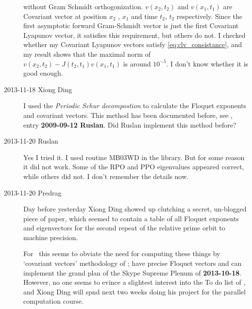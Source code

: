 \begin{description}
without Gram Schmidt orthogonization.  $v(x_2, t_2)$ and  $v(x_1, t_1)$ are Covariant vector
 at position $x_2$ ,  $x_1$ and time $t_2$, $t_2$ respectively. Since the first asymptotic forward Gram-Schmidt vector
is just the first Covariant Lyapunov vector, it satisfies this requirement, but others do not.  I checked whether my Covariant Lyapunov
vectors satisfy  \ref{eq:clv_consistance}, and my result shows that the maximal norm of
$v(x_2, t_2)-J(t_2, t_1)v(x_1, t_1)$ is around $10^{-5}$.
I don't know whether it is good enough.

\item[2013-11-18 Xiong Ding]
I used the \textit{Periodic Schur decompostion}
to calculate the Floquet exponents and covariant vectors. This method has been
documented before,
see , entry  {\bf 2009-09-12 Ruslan}.  Did Ruslan implement this method
before?

\item[2013-11-20 Ruslan] Yes I tried it. I used routine MB03WD in the  library.  But for some reason it did not work.  Some of the RPO and PPO eigenvalues appeared correct, while others did not.  I don't remember the details now.

\item[2013-11-20 Predrag] Day before yesterday Xiong Ding showed up
clutching a secret, un-blogged piece of paper, which seemed to contain
a table of all Floquet exponents and eigenvectors for the second repeat of
the relative prime orbit  to machine precision.

For \KS\ this seems to obviate the need for computing these things by
`covariant vectors' methodology of
; have precise Floquet vectors and can implement the grand
plan of the Skype Supreme Plenum of {\bf 2013-10-18}.
However, no one seems to evince a slightest interest into the {\e To do list} of
, and Xiong Ding will spnd next two weeks doing his
project for the parallel computation course.





\end{description}

\renewcommand{\ssp}{a}
